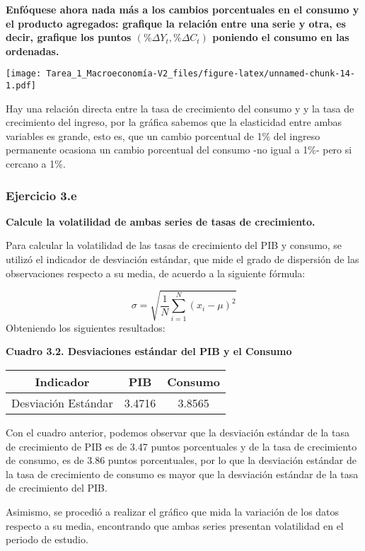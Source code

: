 \documentclass[
]{article}
\begin{document}
\textbf{Enfóquese ahora nada más a los cambios porcentuales en el
consumo y el producto agregados: grafique la relación entre una serie y
otra, es decir, grafique los puntos \((\% \Delta Y_t , \% \Delta C_t)\)
poniendo el consumo en las ordenadas.}

\texttt{[image: Tarea\_1\_Macroeconomía-V2\_files/figure-latex/unnamed-chunk-14-1.pdf]}

Hay una relación directa entre la tasa de crecimiento del consumo y y la
tasa de crecimiento del ingreso, por la gráfica sabemos que la
elasticidad entre ambas variables es grande, esto es, que un cambio
porcentual de 1\% del ingreso permanente ocasiona un cambio porcentual
del consumo -no igual a 1\%- pero si cercano a 1\%.

\hypertarget{ejercicio-3.e}{%
\subsubsection{Ejercicio 3.e}\label{ejercicio-3.e}}

\textbf{Calcule la volatilidad de ambas series de tasas de crecimiento.}

Para calcular la volatilidad de las tasas de crecimiento del PIB y
consumo, se utilizó el indicador de desviación estándar, que mide el
grado de dispersión de las observaciones respecto a su media, de acuerdo
a la siguiente fórmula:

\[\sigma=\sqrt{\frac {1}{N}\sum_{i=1}^{N}(x_i-\mu)^2}\] Obteniendo los
siguientes resultados:

\begin{center}
\textbf{Cuadro 3.2. Desviaciones estándar del PIB y el Consumo}
\end{center}

\begin{longtable}[]{@{}ccc@{}}
\toprule
Indicador & PIB & Consumo \\
\midrule
\endhead
Desviación Estándar & 3.4716 & 3.8565 \\
\bottomrule
\end{longtable}

Con el cuadro anterior, podemos observar que la desviación estándar de
la tasa de crecimiento de PIB es de 3.47 puntos porcentuales y de la
tasa de crecimiento de consumo, es de 3.86 puntos porcentuales, por lo
que la desviación estándar de la tasa de crecimiento de consumo es mayor
que la desviación estándar de la tasa de crecimiento del PIB.

Asimismo, se procedió a realizar el gráfico que mida la variación de los
datos respecto a su media, encontrando que ambas series presentan
volatilidad en el periodo de estudio.
\end{document}
